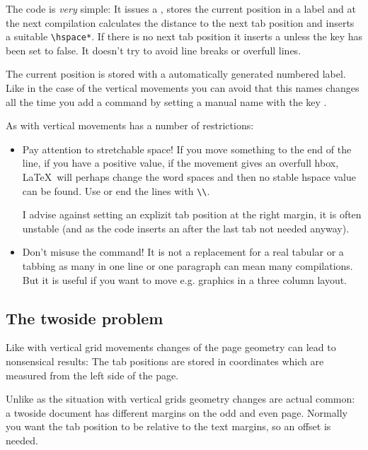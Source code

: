 \documentclass[twoside,parskip=half-,fontsize=12pt,egregdoesnotlikesansseriftitles,headings=normal]{scrartcl}
\begin{document}
The code is \emph{very} simple: It issues a , stores the current position in a label and at the next compilation calculates the distance to the next tab position and inserts a suitable \verb+\hspace*+. If there is no next tab position it inserts a  unless the key  has been set to false. It doesn't try to avoid line breaks or overfull lines.

The current position is stored with a automatically generated numbered label. Like in the case of the vertical movements you can avoid that this names changes all the time you add a command by setting a manual name with the key .

As with vertical movements  has a number of restrictions:

\begin{itemize}
\item Pay attention to stretchable space! If you move something to the end of the line, if you have a positive  value, if the movement gives an overfull hbox, \LaTeX\ will perhaps change the word spaces and then no stable hspace value can be found.  Use  or end the lines with \verb+\\+.

    I advise against setting an explizit tab position at the right margin, it is often unstable (and as the code inserts an  after the last tab not needed anyway).


\item Don't misuse the command! It is not a replacement for a real tabular or a tabbing as many  in one line or one paragraph can mean many compilations. But it is useful if you want to move e.g. graphics in a three column layout.
\end{itemize}

\subsection{The twoside problem}\label{sec:twoside}

Like with vertical grid movements changes of the page geometry can lead to nonsensical results: The tab positions are stored in coordinates which are measured from the left side of the page.

Unlike as the situation with vertical grids geometry changes are actual common:  a twoside document has different margins on the odd and even page. Normally you want the tab position to be relative to the text margins, so an offset is needed.
\end{document}
